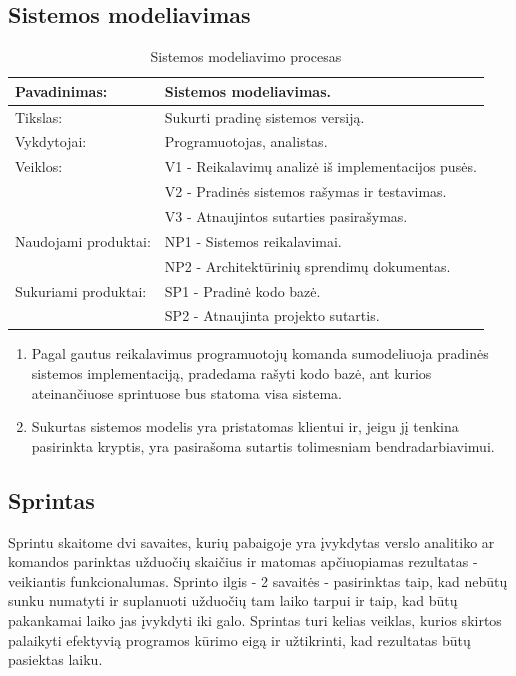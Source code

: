 \documentclass{VUMIFPSkursinis}
\begin{document}
	\subsection{Sistemos modeliavimas}
	\begin{center}
		\begin{table}[ht]
			\caption{Sistemos modeliavimo procesas}
		\begin{tabular}{ | l | l | } 
		\hline
	Pavadinimas:         & Sistemos modeliavimas.          		 					 \\ \hline
	Tikslas: 	           & Sukurti pradinę sistemos versiją. 																	\\ \hline
	Vykdytojai:          & Programuotojas, analistas.  \\ \hline
	Veiklos:             & V1 - Reikalavimų analizė iš implementacijos pusės. 		          \\
											 & V2 - Pradinės sistemos rašymas ir testavimas.					             \\
											 & V3 - Atnaujintos sutarties pasirašymas.									          \\ \hline
	Naudojami produktai: & NP1 - Sistemos reikalavimai. 													  \\
											 & NP2 - Architektūrinių sprendimų dokumentas. \\ \hline
	Sukuriami produktai: & SP1 - Pradinė kodo bazė. 																	          \\
											 & SP2 - Atnaujinta projekto sutartis.										           \\ \hline
\end{tabular}
\end{table}
\end{center}

\begin{enumerate} 
	\item Pagal gautus reikalavimus programuotojų komanda sumodeliuoja pradinės sistemos implementaciją, pradedama rašyti kodo bazė, ant kurios ateinančiuose sprintuose bus statoma visa sistema.
	\item Sukurtas sistemos modelis yra pristatomas klientui ir, jeigu jį tenkina pasirinkta kryptis, yra pasirašoma sutartis tolimesniam bendradarbiavimui.
\end{enumerate}
		
	\subsection{Sprintas}
	Sprintu skaitome dvi savaites, kurių pabaigoje yra įvykdytas verslo analitiko ar komandos parinktas užduočių skaičius ir matomas apčiuopiamas rezultatas - veikiantis funkcionalumas. Sprinto ilgis - 2 savaitės - pasirinktas taip, kad nebūtų sunku numatyti ir suplanuoti užduočių tam laiko tarpui ir taip, kad būtų pakankamai laiko jas įvykdyti iki galo. Sprintas turi kelias veiklas, kurios skirtos palaikyti efektyvią programos kūrimo eigą ir užtikrinti, kad rezultatas būtų pasiektas laiku.
\end{document}
